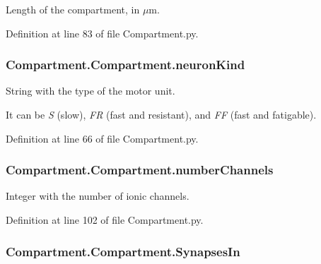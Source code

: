 Length of the compartment, in $\mu$m. 



Definition at line 83 of file Compartment.\+py.

\subsubsection[{\texorpdfstring{neuron\+Kind}{neuronKind}}]{\setlength{\rightskip}{0pt plus 5cm}Compartment.\+Compartment.\+neuron\+Kind}\hypertarget{class_compartment_1_1_compartment_ad42f32769afd94d1e7d7d54008efb6fa}{}\label{class_compartment_1_1_compartment_ad42f32769afd94d1e7d7d54008efb6fa}


String with the type of the motor unit. 

It can be {\itshape S} (slow), {\itshape FR} (fast and resistant), and {\itshape FF} (fast and fatigable). 

Definition at line 66 of file Compartment.\+py.

\subsubsection[{\texorpdfstring{number\+Channels}{numberChannels}}]{\setlength{\rightskip}{0pt plus 5cm}Compartment.\+Compartment.\+number\+Channels}\hypertarget{class_compartment_1_1_compartment_a0fa96147f76e7814f30610027ed425df}{}\label{class_compartment_1_1_compartment_a0fa96147f76e7814f30610027ed425df}


Integer with the number of ionic channels. 



Definition at line 102 of file Compartment.\+py.

\subsubsection[{\texorpdfstring{Synapses\+In}{SynapsesIn}}]{\setlength{\rightskip}{0pt plus 5cm}Compartment.\+Compartment.\+Synapses\+In}\hypertarget{class_compartment_1_1_compartment_abe41aff3bffed80f4b848bd14763d506}{}\label{class_compartment_1_1_compartment_abe41aff3bffed80f4b848bd14763d506}



